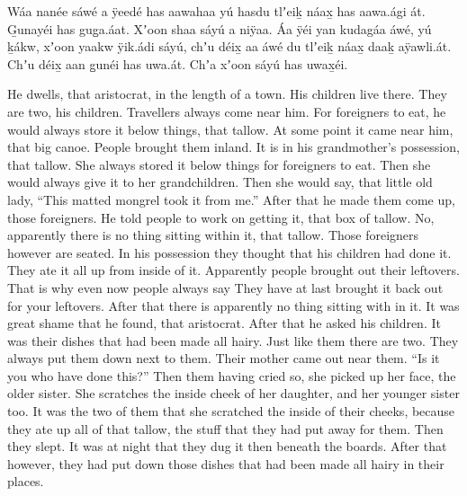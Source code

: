 \begin{pairs}
\begin{Leftside}
Wáa nanée sáwé a ÿeedé has aawahaa yú hasdu tlʼeiḵ náax̱ has aawa.ági át.
G̱unayéi has gug̱a.áat.
Xʼoon shaa sáyú a niÿaa.
Áa ÿéi yan kudagáa áwé, yú ḵákw, xʼoon yaakw ÿik.ádi sáyú,
chʼu déix̱ aa áwé du tlʼeiḵ náax̱ daaḵ aÿawli.át.
Chʼu déix̱ aan g̱unéi has uwa.át.
Chʼa xʼoon sáyú has uwax̱éi.
\pend
\endnumbering
\end{Leftside}
\begin{Rightside}
\beginnumbering
\pstart
\noindent
{}He dwells, that aristocrat, in the length of a town.
His children live there.
They are two, his children.
Travellers always come near him.
For foreigners to eat, he would always store it below things, that tallow.
At some point it came near him, that big canoe.
People brought them inland.
It is in his grandmother’s possession, that tallow.
She always stored it below things for foreigners to eat.
Then she would always give it to her grandchildren.
Then she would say, that little old lady,
\qqk{}“This matted mongrel took it from me.”
\pend
\pstart
{}After that he made them come up, those foreigners.
He told people to work on getting it, that box of tallow.
No, apparently there is no thing sitting within it, that tallow.
Those foreigners however are seated.
In his possession they thought that his children had done it.
They ate it all up from inside of it.
Apparently people brought out their leftovers.
That is why even now people always say
They have at last brought it back out for your leftovers.
After that there is apparently no thing sitting with in it.
It was great shame that he found, that aristocrat.
After that he asked his children.
It was their dishes that had been made all hairy.
Just like them there are two.
They always put them down next to them.
Their mother came out near them.
\qqk{}“Is it you who have done this?”
Then them having cried so, she picked up her face, the older sister.
She scratches the inside cheek of her daughter, and her younger sister too.
It was the two of them that she scratched the inside of their cheeks, because they ate up all of that tallow, the stuff that they had put away for them.
Then they slept.
It was at night that they dug it then beneath the boards.
After that however, they had put down those dishes that had been made all hairy in their places.

\end{Rightside}
\end{pairs}
